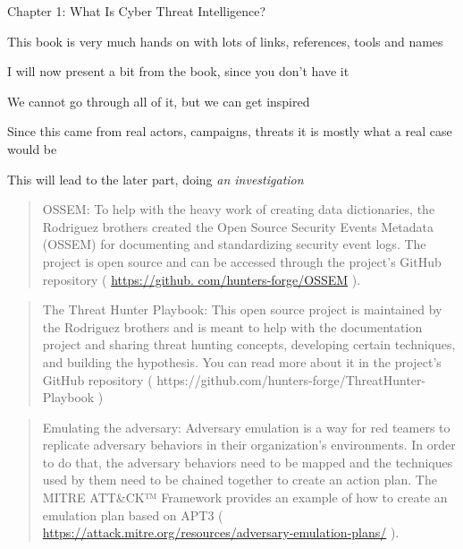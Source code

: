 \documentclass[Screen16to9,17pt]{foils}
\begin{document}
\begin{list2}
\item Chapter 1: What Is Cyber Threat Intelligence?
\item This book is very much hands on with lots of links, references, tools and names
\item I will now present a bit from the book, since you don't have it
\end{list2}



\begin{list2}
\item We cannot go through all of it, but we can get inspired
\item Since this came from real actors, campaigns, threats it is mostly what a real case would be
\end{list2}

This will lead to the later part, doing \emph{an investigation}




\begin{quote}
OSSEM: To help with the heavy work of creating data dictionaries, the Rodriguez
brothers created the Open Source Security Events Metadata (OSSEM) for
documenting and standardizing security event logs. The project is open source and
can be accessed through the project's GitHub repository ( \url{https://github.
com/hunters-forge/OSSEM} ).
\end{quote}




\begin{quote}
The Threat Hunter Playbook: This open source project is maintained by the
Rodriguez brothers and is meant to help with the documentation project and
sharing threat hunting concepts, developing certain techniques, and building
the hypothesis. You can read more about it in the project's GitHub repository
( https://github.com/hunters-forge/ThreatHunter-Playbook )
\end{quote}



\begin{quote}
Emulating the adversary: Adversary emulation is a way for red teamers to
replicate adversary behaviors in their organization's environments. In order to
do that, the adversary behaviors need to be mapped and the techniques used by
them need to be chained together to create an action plan. The MITRE ATT\&CK™
Framework provides an example of how to create an emulation plan based on APT3
( \url{https://attack.mitre.org/resources/adversary-emulation-plans/} ).
\end{quote}
\end{document}
